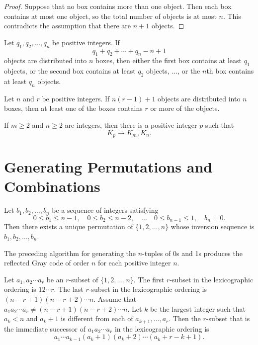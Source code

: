 \begin{proof}
  \leanok
  Suppose that no box contains more than one object. Then each box contains at most one object, so the total number of objects is at most $n$. This contradicts the assumption that there are $n + 1$ objects.
\end{proof}

\begin{theorem}
    \label{thm:3.2.1}
   Let $q_1, q_2, . .. ,q_n$ be positive integers. If
   \[q_1 + q_2 + \cdots + q_n - n + 1\]
objects are distributed into $n$ boxes, then either the first box contains at least $q_1$ objects, or the second box contains at least $q_2$ objects, $\dots$, or the $n$th box contains at least $q_n$ objects.
\end{theorem} 

\begin{corollary}
    \label{cor:3.2.2}
Let $n$ and $r$ be positive integers. If $n(r-1) + 1$
objects are distributed into $n$ boxes, then at least one of the boxes contains $r$ or more of the objects.
\end{corollary}

\begin{theorem}
    \label{thm:3.3.1}
If $m \geq 2$ and $n \geq 2$ are integers, then there is a positive integer $p$ such that
\[K_p \rightarrow K_m, K_n.\]
\end{theorem} 

\chapter{Generating Permutations and Combinations}

\begin{theorem}
    \label{thm:4.2.1}
Let $b_1, b_2, \dots, b_n$ be a sequence of integers satisfying
\[
0 \leq b_1 \leq n-1, \quad 0 \leq b_2 \leq n-2,\quad \dots \quad 0 \leq b_{n-1} \leq 1, \quad b_n = 0.
\]
Then there exists a unique permutation of $\{1, 2, \dots, n\}$ whose inversion sequence is $b_1, b_2, \dots, b_n$.
\end{theorem} 

\begin{theorem}
  \label{thm:4.3.1}
  The preceding algorithm for generating the $n$-tuples of 0s and 1s 
  produces the reflected Gray code of order $n$ for each positive integer $n$.
\end{theorem} 

\begin{theorem}
  \label{thm:4.4.1}
  Let $a_1, a_2 \cdots a_r$ be an $r$-subset of $\{1, 2, \dots, n\}$. 
  The first $r$-subset in the lexicographic ordering is $1 2 \cdots r$. The last $r$-subset 
  in the lexicographic ordering is $(n-r+1)(n-r+2) \cdots n$. Assume that 
  $a_1a_2 \cdots a_r \neq (n-r+1)(n-r+2) \cdots n$. Let $k$ be the largest integer such that 
  $a_k < n$ and $a_k + 1$ is different from each of $a_{k+1}, \dots, a_r$. Then the $r$-subset 
  that is the immediate successor of $a_1a_2 \cdots a_r$ in the lexicographic ordering is
  \[
  a_1 \cdots a_{k-1}(a_k + 1)(a_k + 2) \cdots (a_k + r - k + 1).
  \]
\end{theorem} 


